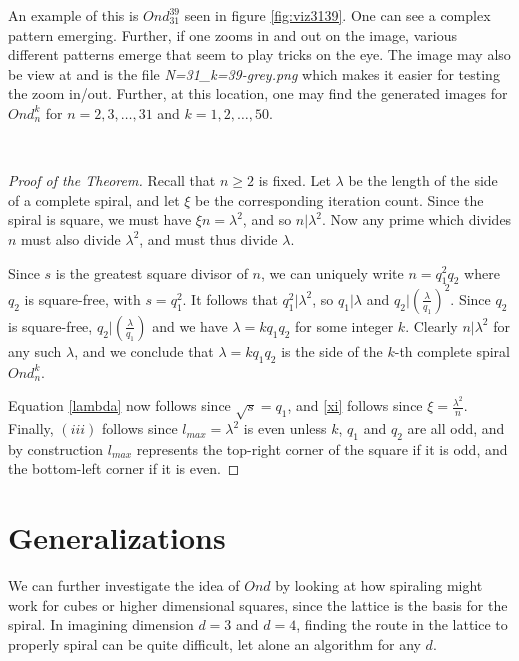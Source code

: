 \documentclass[11pt,reqno]{amsart}
\theoremstyle{mydef}
\begin{document}
An example of this is $Ond^{39}_{31}$ seen in figure \ref{fig:viz3139}. One can
see a complex pattern emerging.  Further, if one zooms
in and out on the image, various different patterns emerge that seem
to play tricks on the eye.  The image may also be view at
\cite{GraySquare} and is the file \textit{N=31\_k=39-grey.png} which
makes it easier for testing the zoom in/out.  Further, at this
location, one may find the generated images for $Ond^k_n$ for $n=2, 3,
\ldots, 31$ and $k=1,2, \ldots, 50$.

\

\begin{proof}[Proof of the Theorem]
  Recall that $n\ge 2$ is fixed.  Let $\lambda$ be the length of the
  side of a complete spiral, and let $\xi$ be the corresponding
  iteration count.  Since the spiral is square, we must have $\xi n =
  \lambda^2$, and so $n \vert \lambda^2$.  Now any prime which divides
  $n$ must also divide $\lambda^2$, and must thus divide $\lambda$.

  Since $s$ is the greatest square divisor of $n$, we can uniquely
  write $n = q^2_1 q_2$ where $q_2$ is square-free, with $s = q_1^2$.
  It follows that $q_1^2|\lambda^2$, so $q_1|\lambda$ and $q_2 |
  (\frac{\lambda}{q_1})^2$.  Since $q_2$ is square-free, $q_2|(\frac{\lambda}{q_1})$
  and we have $\lambda = k q_1 q_2$ for some integer $k$.  Clearly
  $n|\lambda^2$ for any such $\lambda$, and we conclude that $\lambda
  = k q_1 q_2$ is the side of the $k$-th complete spiral $Ond^k_n$.

  Equation \eqref{lambda} now follows since $\sqrt{s} = q_1$, and
  \eqref{xi} follows since $\xi = \frac{\lambda^2}{n}$.  Finally, $(iii)$
  follows since $l_{max} = \lambda^2$ is even unless $k$, $q_1$ and
  $q_2$ are all odd, and by construction $l_{max}$ represents the
  top-right corner of the square if it is odd, and the bottom-left
  corner if it is even.
\end{proof}


\section{Generalizations}

We can further investigate the idea of $Ond$ by looking at how spiraling might
work for cubes or higher dimensional squares, since the lattice is the
basis for the spiral. In imagining dimension $d = 3$ and $d=4$, finding
the route in the lattice to properly spiral can be quite difficult, let alone an algorithm 
for any $d$. 
\end{document}
